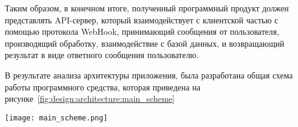 Таким образом, в конечном итоге, полученный программный продукт должен представлять API-сервер, который взаимодействует с клиентской частью с помощью протокола WebHook, принимающий сообщения от пользователя, производящий обработку, взаимодействие с базой данных, и возвращающий результат в виде ответного сообщения пользователю.

В результате анализа архитектуры \cite{baas_architecture} приложения, была разработана общая схема работы программного средства, которая приведена на рисунке~\ref{fig:design:architecture:main_scheme}

\begin{sidewaysfigure}
\centering
	\texttt{[image: main\_scheme.png]}
	\caption{Общая схема работы программного средства}
	\label{fig:design:architecture:main_scheme}
\end{sidewaysfigure}
